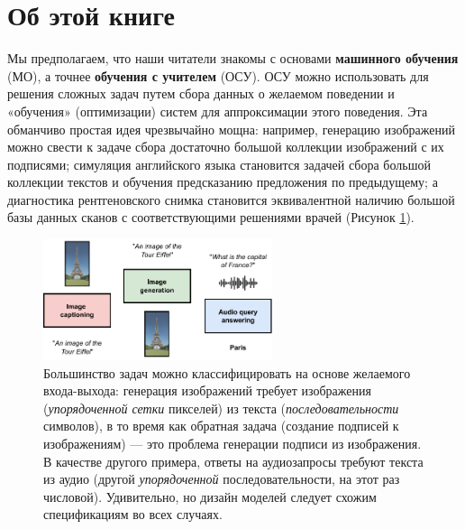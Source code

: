 \section*{Об этой книге}

Мы предполагаем, что наши читатели знакомы с основами \textbf{машинного обучения} (МО), а точнее \textbf{обучения с учителем} (ОСУ). ОСУ можно использовать для решения сложных задач путем сбора данных о желаемом поведении и «обучения» (оптимизации) систем для аппроксимации этого поведения. Эта обманчиво простая идея чрезвычайно мощна: например, генерацию изображений можно свести к задаче сбора достаточно большой коллекции изображений с их подписями; симуляция английского языка становится задачей сбора большой коллекции текстов и обучения предсказанию предложения по предыдущему; а диагностика рентгеновского снимка становится эквивалентной наличию большой базы данных сканов с соответствующими решениями врачей (Рисунок \ref{fig:examples}).

\begin{figure}
    \centering
    \includegraphics[width=0.6\textwidth]{images/examples.pdf}
    \caption{Большинство задач можно классифицировать на основе желаемого входа-выхода: {\color{drawgreen}генерация изображений} требует изображения (\textit{упорядоченной сетки} пикселей) из текста (\textit{последовательности} символов), в то время как обратная задача ({\color{drawred}создание подписей к изображениям}) — это проблема генерации подписи из изображения. В качестве другого примера, {\color{drawblue}ответы на аудиозапросы} требуют текста из аудио (другой \textit{упорядоченной} последовательности, на этот раз числовой). Удивительно, но дизайн моделей следует схожим спецификациям во всех случаях.}
    \label{fig:examples}
\end{figure}

